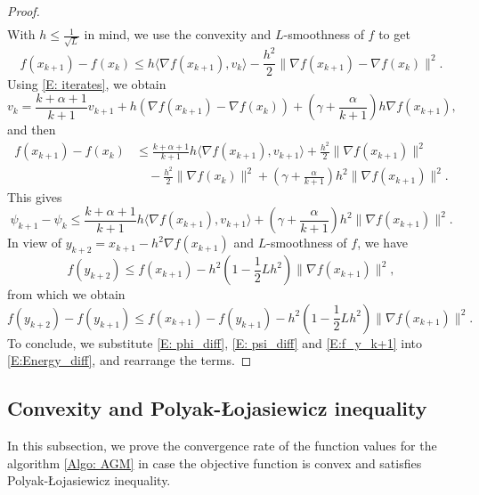 \documentclass[onefignum,onetabnum]{siamart220329}
\begin{document}
\begin{proof}
\begin{align}
\end{align}
With $h\le\frac{1}{\sqrt{L}}$ in mind, we use the convexity and $L$-smoothness of $f$ to get
$$ f(x_{k+1}) - f(x_k) \le h \langle \nabla f(x_{k+1}), v_k \rangle - \frac{h^2}{2}\| \nabla f(x_{k+1}) - \nabla f(x_k) \|^2. $$
Using \eqref{E: iterates}, we obtain
$$ v_k = \frac{k+\alpha+1}{k+1} v_{k+1} + h\left( \nabla f(x_{k+1}) - \nabla f(x_k) \right) + \left( \gamma + \frac{\alpha}{k+1} \right) h \nabla f(x_{k+1}), $$
and then
\begin{align*}
f(x_{k+1}) - f(x_k)
&\le \frac{k+\alpha+1}{k+1} h \langle \nabla f(x_{k+1}), v_{k+1} \rangle
     + \frac{h^2}{2}\| \nabla f(x_{k+1}) \|^2 \\
&\quad  - \frac{h^2}{2}\| \nabla f(x_k) \|^2 
     + \left( \gamma + \frac{\alpha}{k+1} \right) h^2 \| \nabla f(x_{k+1}) \|^2.
\end{align*}
This gives
\begin{equation}\label{E: psi_diff}
\psi_{k+1} - \psi_k 
\le \frac{k+\alpha+1}{k+1} h \langle \nabla f(x_{k+1}), v_{k+1} \rangle
   + \left( \gamma + \frac{\alpha}{k+1} \right) h^2 \| \nabla f(x_{k+1}) \|^2.
\end{equation}
In view of $y_{k+2} = x_{k+1} - h^2\nabla f(x_{k+1})$ and $L$-smoothness of $f$, we have
$$ f(y_{k+2}) \le f(x_{k+1}) - h^2\left( 1 - \frac{1}{2}Lh^2 \right)\| \nabla f(x_{k+1}) \|^2, $$
from which we obtain
\begin{equation} \label{E:f_y_k+1}
f(y_{k+2}) - f(y_{k+1}) \le f(x_{k+1}) - f(y_{k+1}) - h^2\left( 1 - \frac{1}{2}Lh^2 \right)\| \nabla f(x_{k+1}) \|^2.  
\end{equation}
To conclude, we substitute \eqref{E: phi_diff}, \eqref{E: psi_diff} and \eqref{E:f_y_k+1} into \eqref{E:Energy_diff}, and rearrange the terms.
\end{proof}




\subsection{Convexity and Polyak-\L ojasiewicz inequality}
In this subsection, we prove the convergence rate of the function values for the algorithm \eqref{Algo: AGM} in case the objective function is convex and satisfies Polyak-\L ojasiewicz inequality. 
\end{document}

